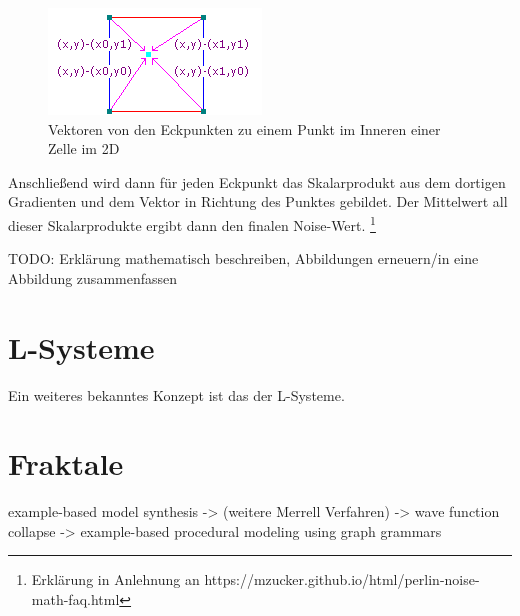 \begin{figure}[h]
    \centering
    \includegraphics[height=\imgHeight]{images/noise_vectors.png}
    \caption{Vektoren von den Eckpunkten zu einem Punkt im Inneren einer Zelle im 2D}
    \label{fig:noise_vectors}
\end{figure}

Anschließend wird dann für jeden Eckpunkt
das Skalarprodukt aus dem dortigen Gradienten und dem Vektor in Richtung des Punktes gebildet. Der Mittelwert all dieser Skalarprodukte ergibt
dann den finalen Noise-Wert. \cite{16_perlin}\footnote{Erklärung in Anlehnung an https://mzucker.github.io/html/perlin-noise-math-faq.html}

TODO: Erklärung mathematisch beschreiben, Abbildungen erneuern/in eine Abbildung zusammenfassen

\section{L-Systeme}
Ein weiteres bekanntes Konzept ist das der L-Systeme.

\section{Fraktale}
\cite{19_mandelbrot_frame}




example-based model synthesis -> (weitere Merrell Verfahren) -> wave function collapse -> example-based procedural modeling using graph grammars